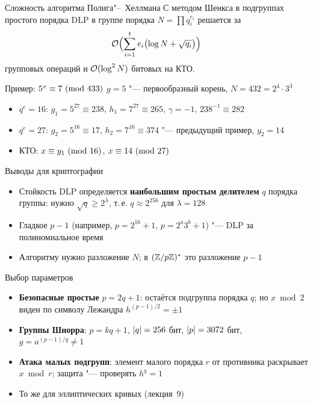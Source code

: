 \documentclass{ca-slides}
\begin{document}
\begin{theoremframe}{Сложность алгоритма Полига"--~Хеллмана}
  С методом Шенкса в подгруппах простого порядка DLP в группе порядка
  $N = \prod q_i^{e_i}$ решается за
  \[
    \mathcal{O}\Bigl(\sum_{i=1}^{t} e_i \bigl(\log N + \sqrt{q_i}\bigr)\Bigr)
  \]
  групповых операций и $\mathcal{O}(\log^2 N)$ битовых на КТО.
\end{theoremframe}

\begin{canvasframe}{Пример: $5^x \equiv 7 \ (\mathrm{mod}\ 433)$}
  \small
  $g = 5$ "--- первообразный корень, $N = 432 = 2^4 \cdot 3^3$
  \begin{itemize}
    \item $q^e = 16$: $g_1 = 5^{27} \equiv 238$, $h_1 = 7^{27} \equiv 265$, $\gamma = -1$,
      $238^{-1} \equiv 282$
  \end{itemize}
  \penspace[0.12\textheight]
  \begin{itemize}
    \item $q^e = 27$: $g_2 = 5^{16} \equiv 17$, $h_2 = 7^{16} \equiv 374$ "--- предыдущий пример,
      $y_2 = 14$
    \item КТО: $x \equiv y_1 \ (\mathrm{mod}\ 16)$, $x \equiv 14 \ (\mathrm{mod}\ 27)$
  \end{itemize}
  \penspace[0.08\textheight]
\end{canvasframe}

\begin{canvasframe}{Выводы для криптографии}
  \begin{itemize}
    \item Стойкость DLP определяется \textbf{наибольшим простым делителем} $q$ порядка группы:
      нужно $\sqrt q \ge 2^\lambda$, т.\,е. $q \approx 2^{256}$ для $\lambda = 128$
    \item Гладкое $p - 1$ (например, $p = 2^{16} + 1$, $p = 2^a 3^b + 1$) "--- DLP за
      полиномиальное время
    \item Алгоритму нужно разложение $N$; в $(\mathbb{Z}/p\mathbb{Z})^{*}$ это разложение $p - 1$
  \end{itemize}
\end{canvasframe}

\begin{canvasframe}{Выбор параметров}
  \small
  \begin{itemize}
    \item \textbf{Безопасные простые} $p = 2q + 1$: остаётся подгруппа порядка $q$; но
      $x \bmod 2$ виден по символу Лежандра $h^{(p-1)/2} = \pm 1$
    \item \textbf{Группы Шнорра}: $p = kq + 1$, $\lvert q\rvert = 256$ бит, $\lvert p\rvert = 3072$ бит,
      $g = a^{(p-1)/q} \ne 1$
    \item \textbf{Атака малых подгрупп}: элемент малого порядка $r$ от противника раскрывает
      $x \bmod r$; защита "--- проверять $h^q = 1$
    \item То же для эллиптических кривых (лекция~9)
  \end{itemize}
\end{canvasframe}
\end{document}

